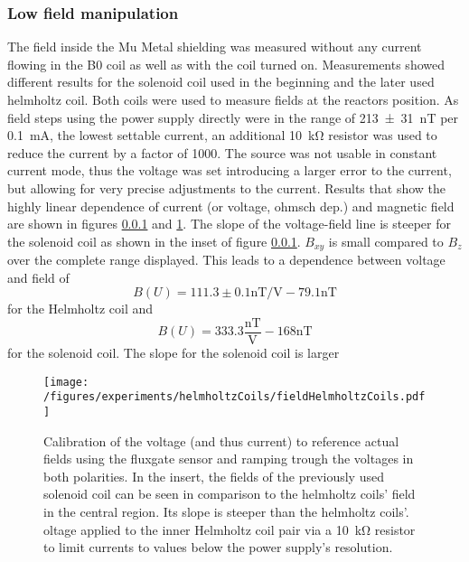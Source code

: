         \subsubsection{Low field manipulation}
        The field inside the Mu Metal shielding was measured without any current flowing in the B0 coil as well as with the coil turned on. Measurements showed different results for the solenoid coil used in the beginning and the later used helmholtz coil. Both coils were used to measure fields at the reactors position. As field steps using the power supply directly were in the range of \SI{213\pm 31}{\nano\tesla} per \SI{0.1}{\milli\ampere}, the lowest settable current, an additional \SI{10}{\kilo\ohm} resistor was used to reduce the current by a factor of 1000. The source was not usable in constant current mode, thus the voltage was set introducing a larger error to the current, but allowing for very precise adjustments to the current. Results that show the highly linear dependence of current (or voltage, ohmsch dep.) and magnetic field are shown in figures \ref{} and \ref{figures:results:helmholtzCoilsCenterField}. The slope of the voltage-field line is steeper for the solenoid coil as shown in the inset of figure \ref{}. $B_{xy}$ is small compared to $B_z$ over the complete range displayed. This leads to a dependence between voltage and field of
        \begin{equation}
            B(U) = 111.3\pm 0.1 \si{\nano\tesla\per\volt} - 79.1 \si{\nano\tesla}
        \end{equation}
        for the Helmholtz coil and
        \begin{equation}
            B(U) = 333.3 \frac{\si{\nano\tesla}}{\si{\volt}} - 168 \si{\nano\tesla}
        \end{equation}
        for the solenoid coil. The slope for the solenoid coil is larger 
            \begin{figure}
                \centering
                \label{figures:results:helmholtzCoilsCenterField}
                \texttt{[image: /figures/experiments/helmholtzCoils/fieldHelmholtzCoils.pdf]}
                \caption{Calibration of the voltage (and thus current) to reference actual fields using the fluxgate sensor and ramping trough the voltages in both polarities. In the insert, the fields of the previously used solenoid coil can be seen in comparison to the helmholtz coils' field in the central region. Its slope is steeper than the helmholtz coils'. oltage applied to the inner Helmholtz coil pair via a \SI{10}{\kilo\ohm} resistor to limit currents to values below the power supply's resolution.}
            \end{figure}
            
